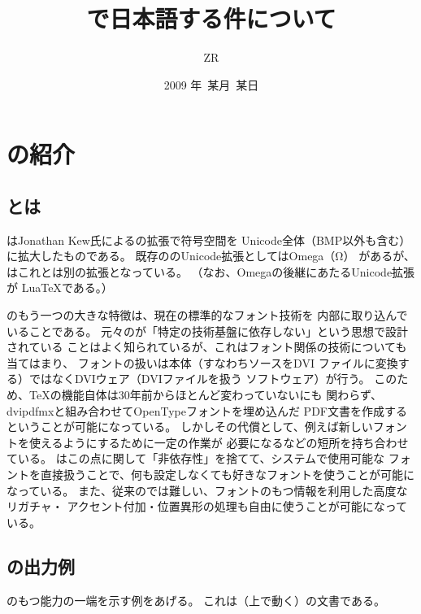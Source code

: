 \documentclass[a4paper]{bxjsarticle}
\begin{document}
\title{{\XeLaTeX}で日本語する件について}
\author{ZR}
\date{2009 年\ 某月\ 某日}
\maketitle

\section{{\XeTeX}\>の紹介}

\subsection{{\XeTeX}\>とは}

{\XeTeX}\>はJonathan Kew氏による\>{\TeX}\>の拡張で符号空間を
Unicode全体（BMP以外も含む）に拡大したものである。
既存の\>{\TeX}\>のUnicode拡張としてはOmega（Ω）
があるが、{\XeTeX}\>はこれとは別の拡張となっている。%
（なお、Omegaの後継にあたるUnicode拡張\>{\TeX}\>が
{Lua\TeX}\>である。）

{\XeTeX}\>のもう一つの大きな特徴は、現在の標準的なフォント技術を
内部に取り込んでいることである。
元々の\>{\TeX}\>が「特定の技術基盤に依存しない」という思想で設計されている
ことはよく知られているが、これはフォント関係の技術についても当てはまり、
フォントの扱いは\>{\TeX}\>本体（すなわち\>{\TeX}\>ソースをDVI
ファイルに変換する）ではなくDVIウェア（DVIファイルを扱う
ソフトウェア）が行う。
このため、{\TeX}\>の機能自体は30年前からほとんど変わっていないにも
関わらず、dvipdfmxと組み合わせてOpenTypeフォントを埋め込んだ
PDF文書を作成するということが可能になっている。
しかしその代償として、例えば新しいフォントを使えるようにするために一定の作業が
必要になるなどの短所を持ち合わせている。
{\XeTeX}\>はこの点に関して「非依存性」を捨てて、システムで使用可能な
フォントを直接扱うことで、何も設定しなくても好きなフォントを使うことが可能に
なっている。
また、従来の\>{\TeX}\>では難しい、フォントのもつ情報を利用した高度なリガチャ・
アクセント付加・位置異形の処理も自由に使うことが可能になっている。

\subsection{{\XeTeX}\>の出力例}

{\XeTeX}\>のもつ能力の一端を示す例をあげる。
これは\>{\XeLaTeX}（{\XeTeX}\>上で動く\>{\LaTeX}）の文書である。
\end{document}
